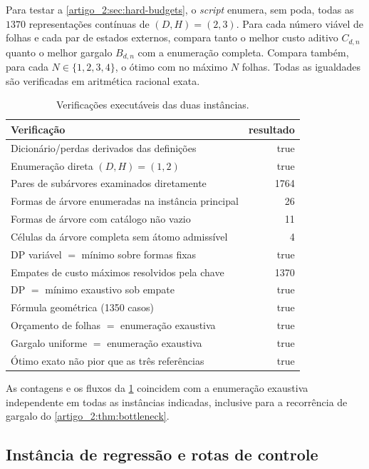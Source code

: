 Para testar a \cref{artigo_2:sec:hard-budgets}, o \emph{script} enumera, sem poda, todas as
$1370$ representações contínuas de $(D,H)=(2,3)$. Para cada número viável de
folhas e cada par de estados externos, compara tanto o melhor custo aditivo
$C_{d,n}$ quanto o melhor gargalo $B_{d,n}$ com a enumeração completa. Compara
também, para cada $N\in\{1,2,3,4\}$, o ótimo com no máximo $N$ folhas. Todas
as igualdades são verificadas em aritmética racional exata.

\begin{table}[t]
 \centering
 \caption{Verificações executáveis das duas instâncias.}
 \label{artigo_2:tab:dp-audit}
 \small
 \begin{tabularx}{\linewidth}{@{}Xr@{}}
\toprule
Verificação & resultado \\
\midrule
Dicionário/perdas derivados das definições & true \\
Enumeração direta $(D,H)=(1,2)$ & true \\
Pares de subárvores examinados diretamente & 1764 \\
Formas de árvore enumeradas na instância principal & 26 \\
Formas de árvore com catálogo não vazio & 11 \\
Células da árvore completa sem átomo admissível & 4 \\
DP variável $=$ mínimo sobre formas fixas & true \\
Empates de custo máximos resolvidos pela chave & 1370 \\
DP $=$ mínimo exaustivo sob empate & true \\
Fórmula geométrica (1350 casos) & true \\
Orçamento de folhas $=$ enumeração exaustiva & true \\
Gargalo uniforme $=$ enumeração exaustiva & true \\
Ótimo exato não pior que as três referências & true \\
\bottomrule
\end{tabularx}

\end{table}

As contagens e os fluxos da \cref{artigo_2:tab:dp-audit} coincidem com a enumeração
exaustiva independente em todas as instâncias indicadas, inclusive para a
recorrência de gargalo do \cref{artigo_2:thm:bottleneck}.

\subsection{Instância de regressão e rotas de controle}

